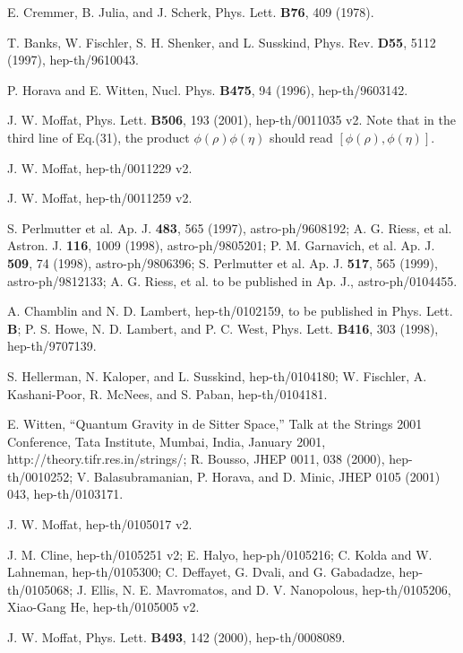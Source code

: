 \documentclass[a4paper,12pt]{article}
\begin{document}
\begin{thebibliography}{100}

 E. Cremmer, B. Julia, and J. Scherk, Phys. Lett. {\bf
B76}, 409 (1978).

 T. Banks, W. Fischler, S. H. Shenker, and L. Susskind,
Phys. Rev. {\bf D55}, 5112 (1997), hep-th/9610043.

 P. Horava and E. Witten, Nucl. Phys. {\bf B475}, 94
(1996), hep-th/9603142.

 J. W. Moffat, Phys. Lett. {\bf B506}, 193
(2001), hep-th/0011035 v2. Note that in the third line of Eq.(31), the
product $\phi(\rho)\phi(\eta)$ should read $[\phi(\rho),\phi(\eta)]$.

 J. W. Moffat, hep-th/0011229 v2.

 J. W. Moffat, hep-th/0011259 v2.

 S. Perlmutter et al. Ap. J. {\bf 483},
565 (1997), astro-ph/9608192; A. G. Riess, et al. Astron. J. {\bf 116},
1009 (1998), astro-ph/9805201; P. M. Garnavich, et al. Ap. J. {\bf 509}, 74
(1998), astro-ph/9806396; S. Perlmutter et al. Ap. J. {\bf 517}, 565
(1999), astro-ph/9812133; A. G. Riess, et al. to be published in Ap. J.,
astro-ph/0104455.

 A. Chamblin and N. D. Lambert, hep-th/0102159, to be
published in Phys. Lett. {\bf B}; P. S. Howe, N. D. Lambert, and P. C.
West, Phys. Lett. {\bf B416}, 303 (1998), hep-th/9707139.

 S. Hellerman, N. Kaloper, and L. Susskind,
hep-th/0104180; W. Fischler, A. Kashani-Poor, R. McNees, and S. Paban,
hep-th/0104181.

 E. Witten, ``Quantum Gravity in de Sitter Space,'' Talk at
the Strings 2001 Conference, Tata Institute, Mumbai, India, January 2001,
http://theory.tifr.res.in/strings/; R. Bousso, JHEP 0011, 038 (2000),
hep-th/0010252; V. Balasubramanian, P. Horava,
and D. Minic, JHEP 0105 (2001) 043, hep-th/0103171.

 J. W. Moffat, hep-th/0105017 v2.

 J. M. Cline, hep-th/0105251 v2; E. Halyo, hep-ph/0105216;
C. Kolda and W. Lahneman, hep-th/0105300; C. Deffayet, G. Dvali, and G.
Gabadadze, hep-th/0105068; J. Ellis, N. E. Mavromatos, and D. V.
Nanopolous, hep-th/0105206, Xiao-Gang He, hep-th/0105005 v2.

 J. W. Moffat, Phys. Lett. {\bf B493}, 142 (2000),
hep-th/0008089.


\end{thebibliography}
\end{document}

